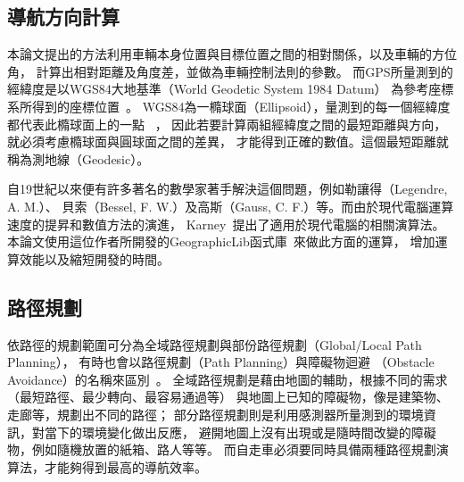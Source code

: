 \subsection{導航方向計算}
本論文提出的方法利用車輛本身位置與目標位置之間的相對關係，以及車輛的方位角，
計算出相對距離及角度差，並做為車輛控制法則的參數。
而GPS所量測到的經緯度是以WGS84大地基準（World Geodetic System 1984 Datum）
為參考座標系所得到的座標位置~\cite{Xsens:2012:MTiG_Manual}。
WGS84為一橢球面（Ellipsoid），量測到的每一個經緯度都代表此橢球面上的一點
~\cite{El-Rabbany:2006:IntroGPS}，
因此若要計算兩組經緯度之間的最短距離與方向，就必須考慮橢球面與圓球面之間的差異，
才能得到正確的數值。這個最短距離就稱為測地線（Geodesic）\cite{Karney:2013:Algorithms_for_Geodesics}。

自19世紀以來便有許多著名的數學家著手解決這個問題，例如勒讓得（Legendre, A. M.）、
貝索（Bessel, F. W.）及高斯（Gauss, C. F.）等。而由於現代電腦運算速度的提昇和數值方法的演進，
Karney~\cite{Karney:2013:Algorithms_for_Geodesics}提出了適用於現代電腦的相關演算法。
本論文使用這位作者所開發的GeographicLib函式庫~\cite{website:GeographicLib}來做此方面的運算，
增加運算效能以及縮短開發的時間。

\subsection{路徑規劃}
依路徑的規劃範圍可分為全域路徑規劃與部份路徑規劃（Global/Local Path Planning），
有時也會以路徑規劃（Path Planning）與障礙物迴避
（Obstacle Avoidance）的名稱來區別~\cite{Siegwart:2004:IAMR}。
全域路徑規劃是藉由地圖的輔助，根據不同的需求（最短路徑、最少轉向、最容易通過等）
與地圖上已知的障礙物，像是建築物、走廊等，規劃出不同的路徑；
部分路徑規劃則是利用感測器所量測到的環境資訊，對當下的環境變化做出反應，
避開地圖上沒有出現或是隨時間改變的障礙物，例如隨機放置的紙箱、路人等等。
而自走車必須要同時具備兩種路徑規劃演算法，才能夠得到最高的導航效率。

